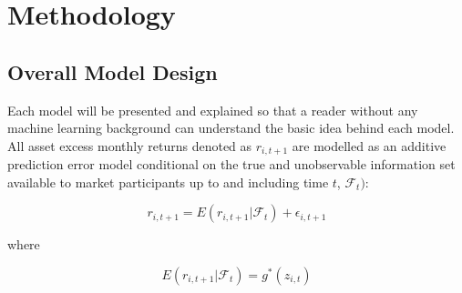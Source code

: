 \documentclass[a4paper, table]{article}
\newcommand{\smalltodo}[2][] {\todo[caption={#2}, size=\scriptsize,%
	fancyline,#1]{\begin{spacing}{.5}#2\end{spacing}}}
\newcommand{\rhs}[2][]{\smalltodo[color=green!30,#1]{{\bf RS:} #2}}
\begin{document}






\section{Methodology}

\subsection{Overall Model Design}

Each model will be presented and explained so that a reader without any machine learning background can understand the basic idea behind each model. All asset excess monthly returns denoted as $r_{i, t+1}$ are modelled as an additive prediction error model conditional on the true and unobservable information set available to market participants up to and including time $t$, $\mathcal{F}_t)$:

\begin{equation}
	r_{i, t+1} = E(r_{i, t+1} | \mathcal{F}_t) + \epsilon_{i, t+1}
\end{equation}

where 

\begin{equation}
	E(r_{i, t+1} | \mathcal{F}_t) = g^*(z_{i,t})
\end{equation}
\end{document}
